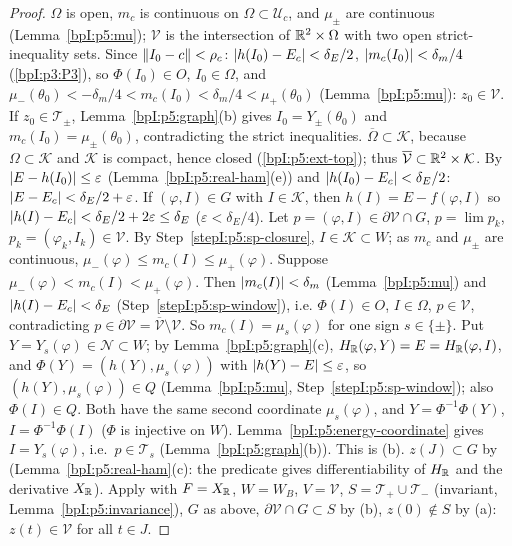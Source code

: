 \begin{proof}
\label{stepI:p5:sp-open} $\Omega$ is open, $m_c$ is continuous on $\Omega\subset\mathcal U_c$, and $\mu_\pm$ are continuous (Lemma~\ref{bpI:p5:mu}); $\mathcal V$ is the intersection of $\mathbb{R}^2\times\Omega$ with two open strict-inequality sets.
\label{stepI:p5:sp-init} Since $\lVert I_0-c\rVert<\rho_c$: $\lvert h(I_0)-E_c\rvert<\delta_E/2$, $\lvert m_c(I_0)\rvert<\delta_m/4$ (\ref{bpI:p3:P3}), so $\Phi(I_0)\in O$, $I_0\in\Omega$, and $\mu_-(\theta_0)<-\delta_m/4<m_c(I_0)<\delta_m/4<\mu_+(\theta_0)$ (Lemma~\ref{bpI:p5:mu}): $z_0\in\mathcal V$. If $z_0\in\mathcal T_\pm$, Lemma~\ref{bpI:p5:graph}(b) gives $I_0=Y_\pm(\theta_0)$ and $m_c(I_0)=\mu_\pm(\theta_0)$, contradicting the strict inequalities.
\label{stepI:p5:sp-closure} $\overline\Omega\subset\mathcal K$, because $\Omega\subset\mathcal K$ and $\mathcal K$ is compact, hence closed (\ref{bpI:p5:ext-top}); thus $\overline{\mathcal V}\subset\mathbb{R}^2\times\mathcal K$.
\label{stepI:p5:sp-window} By $\lvert E-h(I_0)\rvert\le\varepsilon$ (Lemma~\ref{bpI:p5:real-ham}(e)) and $\lvert h(I_0)-E_c\rvert<\delta_E/2$: $\lvert E-E_c\rvert<\delta_E/2+\varepsilon$. If $(\varphi,I)\in G$ with $I\in\mathcal K$, then $h(I)=E-f(\varphi,I)$ so $\lvert h(I)-E_c\rvert<\delta_E/2+2\varepsilon\le\delta_E$ ($\varepsilon<\delta_E/4$).
\label{stepI:p5:sp-bdry} Let $p=(\varphi,I)\in\partial\mathcal V\cap G$, $p=\lim p_k$, $p_k=(\varphi_k,I_k)\in\mathcal V$. By Step~\ref{stepI:p5:sp-closure}, $I\in\mathcal K\subset W$; as $m_c$ and $\mu_\pm$ are continuous, $\mu_-(\varphi)\le m_c(I)\le\mu_+(\varphi)$. Suppose $\mu_-(\varphi)<m_c(I)<\mu_+(\varphi)$. Then $\lvert m_c(I)\rvert<\delta_m$ (Lemma~\ref{bpI:p5:mu}) and $\lvert h(I)-E_c\rvert<\delta_E$ (Step~\ref{stepI:p5:sp-window}), i.e. $\Phi(I)\in O$, $I\in\Omega$, $p\in\mathcal V$, contradicting $p\in\partial\mathcal V=\overline{\mathcal V}\setminus\mathcal V$. So $m_c(I)=\mu_s(\varphi)$ for one sign $s\in\{\pm\}$. Put $Y=Y_s(\varphi)\in\mathcal N\subset W$; by Lemma~\ref{bpI:p5:graph}(c), $H_{\mathbb{R}}(\varphi,Y)=E=H_{\mathbb{R}}(\varphi,I)$, and $\Phi(Y)=(h(Y),\mu_s(\varphi))$ with $\lvert h(Y)-E\rvert\le\varepsilon$, so $(h(Y),\mu_s(\varphi))\in Q$ (Lemma~\ref{bpI:p5:mu}, Step~\ref{stepI:p5:sp-window}); also $\Phi(I)\in Q$. Both have the same second coordinate $\mu_s(\varphi)$, and $Y=\Phi^{-1}\Phi(Y)$, $I=\Phi^{-1}\Phi(I)$ ($\Phi$ is injective on $W$). Lemma~\ref{bpI:p5:energy-coordinate} gives $I=Y_s(\varphi)$, i.e.\ $p\in\mathcal T_s$ (Lemma~\ref{bpI:p5:graph}(b)). This is (b).
\label{stepI:p5:sp-barrier} $z(J)\subset G$ by  (Lemma~\ref{bpI:p5:real-ham}(c): the predicate gives differentiability of $H_{\mathbb{R}}$ and the derivative $X_{\mathbb{R}}$). Apply  with $F=X_{\mathbb{R}}$, $W=W_B$, $V=\mathcal V$, $S=\mathcal T_+\cup\mathcal T_-$ (invariant, Lemma~\ref{bpI:p5:invariance}), $G$ as above, $\partial\mathcal V\cap G\subset S$ by (b), $z(0)\notin S$ by (a): $z(t)\in\mathcal V$ for all $t\in J$.
\end{proof}

